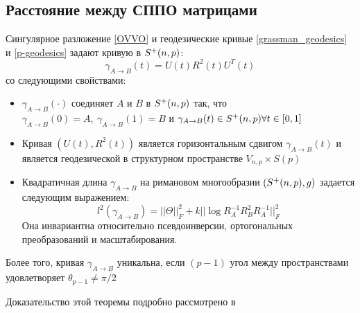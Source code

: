 \subsection{Расстояние между СППО матрицами}
\begin{theorem}
Сингулярное разложение \eqref{OVVO} и геодезические кривые \eqref{grassman_geodesics} и \eqref{p-geodesics} задают кривую в $S^+(n,p)$:
$$ \gamma_{A \rightarrow B}(t) = U(t)R^2(t)U^T(t) $$
со следующими свойствами:
\begin{itemize}
    \item $\gamma_{A \to B}(\cdot)$ соединяет $A$ и $B$ в $S^+(n,p)$ так, что $\gamma_{A \to B}(0) = A, \ \gamma_{A \to B}(1)=B$ и $\gamma_{A \to B}(t) \in S^+(n,p) \forall t \in [0, 1]$
    \item Кривая $(U(t), R^2(t))$ является горизонтальным сдвигом $\gamma_{A \to B}(t)$ и является геодезической в структурном пространстве $V_{n,p} \times S(p)$
    \item Квадратичная длина $\gamma_{A \to B}$ на римановом многообразии $(S^+(n,p), g)$ задается следующим выражением:
    \begin{equation}
        \label{spsd-distance}
         l^2(\gamma_{A \to B}) = ||\Theta||_F^2 + k ||\log R_A^{-1} R_B^2 R_A^{-1}||_F^2
    \end{equation}
    Она инвариантна относительно псевдоинверсии, ортогональных преобразований и масштабирования.
\end{itemize}
Более того, кривая $\gamma_{A \to B}$ уникальна, если $(p-1)$ угол между пространствами удовлетворяет $\theta_{p-1} \neq \pi/2$
\end{theorem}
Доказательство этой теоремы подробно рассмотрено в \cite{bonnabel2009riemannian}